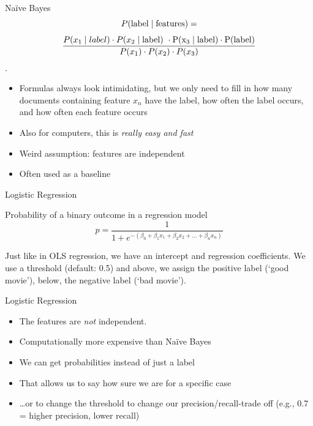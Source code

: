 \documentclass[compress]{beamer}
\begin{document}
\begin{frame}{Na\"ive Bayes}
$$ P(\rm{label} \mid \rm{features}) =$$
$$ \frac{P(x_1 \mid label) \cdot P(x_2 \mid \rm{label})\ \cdot P(x_3 \mid label) \cdot P(label)}{P(x_1) \cdot P(x_2) \cdot P(x_3)}$$.

	
\begin{itemize}
	\item Formulas always look intimidating, but we only need to fill in how many documents containing feature $x_n$ have the label, how often the label occurs, and how often each feature occurs
	\item Also for computers, this is \emph{really easy and fast}
	\item Weird assumption: features are independent
	\item Often used as a baseline
\end{itemize}
\end{frame}




\begin{frame}{Logistic Regression}
	\begin{block}{Probability of a binary outcome in a regression model}
		$$p = \frac{1}{1 + e^{-(\beta_0 + \beta_1 x_1 + \beta_2 x_2 + \ldots + \beta_n x_n)}}$$
	\end{block}
	Just like in OLS regression, we have an intercept and regression coefficients. 
	We use a threshold (default: 0.5) and above, we assign the positive label (`good movie'), below, the negative label (`bad movie').
\end{frame}
\begin{frame}{Logistic Regression}
	\begin{itemize}[<+->]
		\item The features are \emph{not} independent.
		\item Computationally more expensive than Naïve Bayes
		\item We can get probabilities instead of just a label
		\item That allows us to say how sure we are for a specific case
		\item \ldots or to change the threshold to change our precision/recall-trade off (e.g., 0.7 = higher precision, lower recall)
	\end{itemize}
\end{frame}
\end{document}

